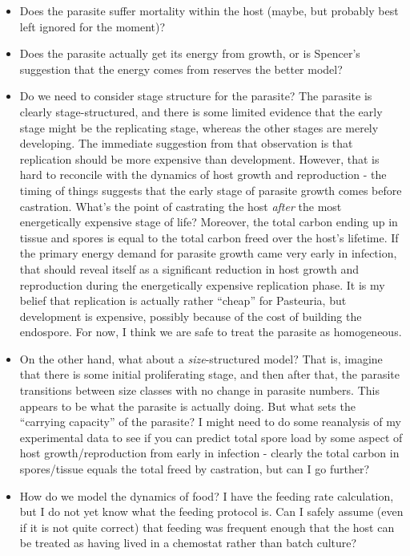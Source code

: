 \documentclass[11pt,reqno,final,pdftex]{amsart}\usepackage[]{graphicx}\usepackage[]{color}
\theoremstyle{plain}
\numberwithin{equation}{part}
\begin{document}
\begin{itemize}
\item Does the parasite suffer mortality within the host (maybe, but probably best left ignored for the moment)?
\item Does the parasite actually get its energy from growth, or is Spencer's suggestion that the energy comes from reserves the better model?
\item Do we need to consider stage structure for the parasite? The parasite is clearly stage-structured, and there is some limited evidence that the early stage might be the replicating stage, whereas the other stages are merely developing. The immediate suggestion from that observation is that replication should be more expensive than development. However, that is hard to reconcile with the dynamics of host growth and reproduction - the timing of things suggests that the early stage of parasite growth comes before castration. What's the point of castrating the host \emph{after} the most energetically expensive stage of life? Moreover, the total carbon ending up in tissue and spores is equal to the total carbon freed over the host's lifetime. If the primary energy demand for parasite growth came very early in infection, that should reveal itself as a significant reduction in host growth and reproduction during the energetically expensive replication phase. It is my belief that replication is actually rather ``cheap'' for Pasteuria, but development is expensive, possibly because of the cost of building the endospore. For now, I think we are safe to treat the parasite as homogeneous.
\item On the other hand, what about a \emph{size}-structured model? That is, imagine that there is some initial proliferating stage, and then after that, the parasite transitions between size classes with no change in parasite numbers. This appears to be what the parasite is actually doing. But what sets the ``carrying capacity'' of the parasite? I might need to do some reanalysis of my experimental data to see if you can predict total spore load by some aspect of host growth/reproduction from early in infection - clearly the total carbon in spores/tissue equals the total freed by castration, but can I go further?
\item How do we model the dynamics of food? I have the feeding rate calculation, but I do not yet know what the feeding protocol is. Can I safely assume (even if it is not quite correct) that feeding was frequent enough that the host can be treated as having lived in a chemostat rather than batch culture?
\end{itemize}
\end{document}
